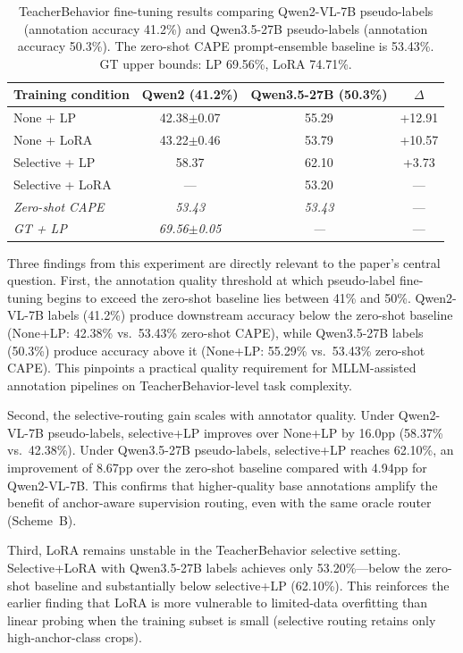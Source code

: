 \documentclass{ieeeaccess}
\begin{document}
\begin{table}[!t]
\caption{TeacherBehavior fine-tuning results comparing Qwen2-VL-7B
pseudo-labels (annotation accuracy 41.2\%) and Qwen3.5-27B pseudo-labels
(annotation accuracy 50.3\%).
The zero-shot CAPE prompt-ensemble baseline is 53.43\%.
GT upper bounds: LP 69.56\%, LoRA 74.71\%.}
\label{tab:quality_threshold}
\centering
\begin{tabular}{lccc}
\toprule
\textbf{Training condition} & \textbf{Qwen2 (41.2\%)} & \textbf{Qwen3.5-27B (50.3\%)} & \textbf{$\Delta$} \\
\midrule
None + LP  & 42.38$\pm$0.07 & 55.29 & +12.91 \\
None + LoRA & 43.22$\pm$0.46 & 53.79 & +10.57 \\
Selective + LP & 58.37 & 62.10 & +3.73 \\
Selective + LoRA & --- & 53.20 & --- \\
\midrule
\emph{Zero-shot CAPE} & \emph{53.43} & \emph{53.43} & --- \\
\emph{GT + LP} & \emph{69.56$\pm$0.05} & \emph{---} & --- \\
\bottomrule
\end{tabular}
\end{table}

Three findings from this experiment are directly relevant to the paper's
central question.
First, the annotation quality threshold at which pseudo-label fine-tuning
begins to exceed the zero-shot baseline lies between 41\% and 50\%.
Qwen2-VL-7B labels (41.2\%) produce downstream accuracy below the
zero-shot baseline (None+LP: 42.38\% vs.\ 53.43\% zero-shot CAPE), while
Qwen3.5-27B labels (50.3\%) produce accuracy above it (None+LP: 55.29\%
vs.\ 53.43\% zero-shot CAPE).
This pinpoints a practical quality requirement for MLLM-assisted
annotation pipelines on TeacherBehavior-level task complexity.

Second, the selective-routing gain scales with annotator quality.
Under Qwen2-VL-7B pseudo-labels, selective+LP improves over None+LP
by 16.0pp (58.37\% vs.\ 42.38\%).
Under Qwen3.5-27B pseudo-labels, selective+LP reaches 62.10\%, an
improvement of 8.67pp over the zero-shot baseline compared with 4.94pp
for Qwen2-VL-7B.
This confirms that higher-quality base annotations amplify the benefit
of anchor-aware supervision routing, even with the same oracle router
(Scheme~B).

Third, LoRA remains unstable in the TeacherBehavior selective setting.
Selective+LoRA with Qwen3.5-27B labels achieves only 53.20\%---below
the zero-shot baseline and substantially below selective+LP (62.10\%).
This reinforces the earlier finding that LoRA is more vulnerable to
limited-data overfitting than linear probing when the training subset
is small (selective routing retains only high-anchor-class crops).
\end{document}
